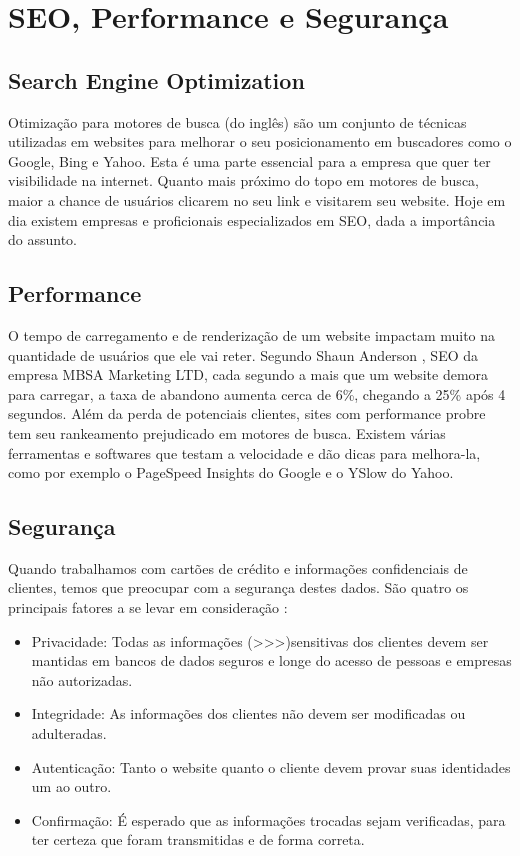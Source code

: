 \section{SEO, Performance e Segurança}

\subsection{Search Engine Optimization}

Otimização para motores de busca (do inglês) são um conjunto de técnicas utilizadas em websites para melhorar o seu posicionamento em buscadores como o Google, Bing e Yahoo. Esta é uma parte essencial para a empresa que quer ter visibilidade na internet. Quanto mais próximo do topo em motores de busca, maior a chance de usuários clicarem no seu link e visitarem seu website. Hoje em dia existem empresas e proficionais especializados em SEO, dada a importância do assunto.

\subsection{Performance}

O tempo de carregamento e de renderização de um website impactam muito na quantidade de usuários que ele vai reter. Segundo Shaun Anderson \cite{LoadTime}, SEO da empresa MBSA Marketing LTD, cada segundo a mais que um website demora para carregar, a taxa de abandono aumenta cerca de 6\%, chegando a 25\% após 4 segundos. Além da perda de potenciais clientes, sites com performance probre tem seu rankeamento prejudicado em motores de busca. Existem várias ferramentas e softwares que testam a velocidade e dão dicas para melhora-la, como por exemplo o PageSpeed Insights do Google e o YSlow do Yahoo.

\subsection{Segurança}

Quando trabalhamos com cartões de crédito e informações confidenciais de clientes, temos que preocupar com a segurança destes dados. São quatro os principais fatores a se levar em consideração \cite{SecurityEcommerce}:

\begin{itemize}
  \item Privacidade: Todas as informações (\TODO >>>)sensitivas dos clientes devem ser mantidas em bancos de dados seguros e longe do acesso de pessoas e empresas não autorizadas.
  \item Integridade: As informações dos clientes não devem ser modificadas ou adulteradas.
  \item Autenticação: Tanto o website quanto o cliente devem provar suas identidades um ao outro.
  \item Confirmação: É esperado que as informações trocadas sejam verificadas, para ter certeza que foram transmitidas e de forma correta.
\end{itemize}


